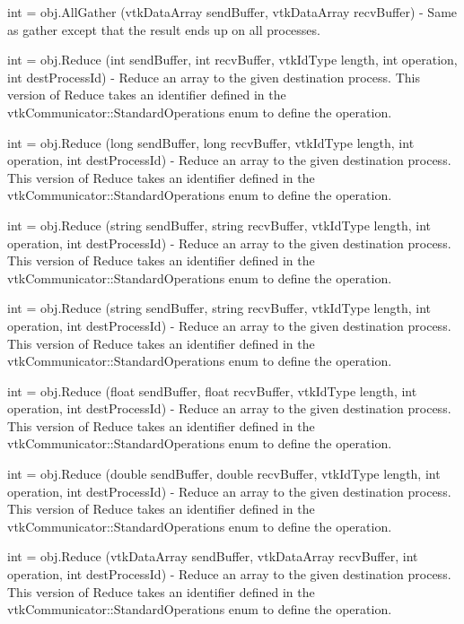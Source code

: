 \begin{DoxyItemize}
\item {\ttfamily int = obj.\-All\-Gather (vtk\-Data\-Array send\-Buffer, vtk\-Data\-Array recv\-Buffer)} -\/ Same as gather except that the result ends up on all processes.  
\item {\ttfamily int = obj.\-Reduce (int send\-Buffer, int recv\-Buffer, vtk\-Id\-Type length, int operation, int dest\-Process\-Id)} -\/ Reduce an array to the given destination process. This version of Reduce takes an identifier defined in the vtk\-Communicator\-::\-Standard\-Operations enum to define the operation.  
\item {\ttfamily int = obj.\-Reduce (long send\-Buffer, long recv\-Buffer, vtk\-Id\-Type length, int operation, int dest\-Process\-Id)} -\/ Reduce an array to the given destination process. This version of Reduce takes an identifier defined in the vtk\-Communicator\-::\-Standard\-Operations enum to define the operation.  
\item {\ttfamily int = obj.\-Reduce (string send\-Buffer, string recv\-Buffer, vtk\-Id\-Type length, int operation, int dest\-Process\-Id)} -\/ Reduce an array to the given destination process. This version of Reduce takes an identifier defined in the vtk\-Communicator\-::\-Standard\-Operations enum to define the operation.  
\item {\ttfamily int = obj.\-Reduce (string send\-Buffer, string recv\-Buffer, vtk\-Id\-Type length, int operation, int dest\-Process\-Id)} -\/ Reduce an array to the given destination process. This version of Reduce takes an identifier defined in the vtk\-Communicator\-::\-Standard\-Operations enum to define the operation.  
\item {\ttfamily int = obj.\-Reduce (float send\-Buffer, float recv\-Buffer, vtk\-Id\-Type length, int operation, int dest\-Process\-Id)} -\/ Reduce an array to the given destination process. This version of Reduce takes an identifier defined in the vtk\-Communicator\-::\-Standard\-Operations enum to define the operation.  
\item {\ttfamily int = obj.\-Reduce (double send\-Buffer, double recv\-Buffer, vtk\-Id\-Type length, int operation, int dest\-Process\-Id)} -\/ Reduce an array to the given destination process. This version of Reduce takes an identifier defined in the vtk\-Communicator\-::\-Standard\-Operations enum to define the operation.  
\item {\ttfamily int = obj.\-Reduce (vtk\-Data\-Array send\-Buffer, vtk\-Data\-Array recv\-Buffer, int operation, int dest\-Process\-Id)} -\/ Reduce an array to the given destination process. This version of Reduce takes an identifier defined in the vtk\-Communicator\-::\-Standard\-Operations enum to define the operation.  

\end{DoxyItemize}
